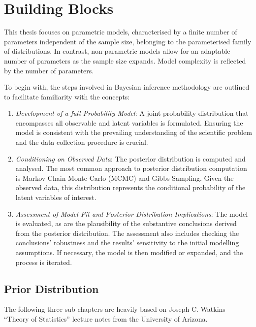 \documentclass[
  11pt,
]{article}
\begin{document}
\newpage

\section{Building Blocks}

This thesis focuses on parametric models, characterised by a finite
number of parameters independent of the sample size, belonging to the
parameterised family of distributions. In contrast, non-parametric
models allow for an adaptable number of parameters as the sample size
expands. Model complexity is reflected by the number of parameters.

To begin with, the steps involved in Bayesian inference methodology are
outlined to facilitate familiarity with the concepts:

\begin{enumerate}
\def\labelenumi{\arabic{enumi}.}
\item
  \emph{Development of a full Probability Model}: A joint probability
  distribution that encompasses all observable and latent variables is
  formulated. Ensuring the model is consistent with the prevailing
  understanding of the scientific problem and the data collection
  procedure is crucial.
\item
  \emph{Conditioning on Observed Data}: The posterior distribution is
  computed and analysed. The most common approach to posterior
  distribution computation is Markov Chain Monte Carlo (MCMC) and Gibbs
  Sampling. Given the observed data, this distribution represents the
  conditional probability of the latent variables of interest.
\item
  \emph{Assessment of Model Fit and Posterior Distribution
  Implications}: The model is evaluated, as are the plausibility of the
  substantive conclusions derived from the posterior distribution. The
  assessment also includes checking the conclusions' robustness and the
  results' sensitivity to the initial modelling assumptions. If
  necessary, the model is then modified or expanded, and the process is
  iterated.
\end{enumerate}

\subsection{Prior Distribution}

The following three sub-chapters are heavily based on Joseph C. Watkins
``Theory of Statistics'' lecture notes from the University of Arizona.
\end{document}
